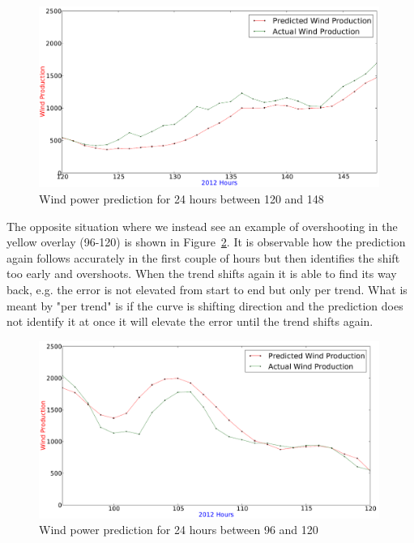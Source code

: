 \begin{figure}[H]
\centering
\includegraphics[width=0.99\textwidth]{billeder/bestInputCombi120-148.png}
\caption{Wind power prediction for 24 hours between 120 and 148}
\label{fig:bestInputCombi120-148}
\end{figure} 

The opposite situation where we instead see an example of overshooting in the yellow overlay (96-120) is shown in Figure~\ref{fig:bestInputCombi96-120}. It is observable how the prediction again follows accurately in the first couple of hours but then identifies the shift too early and overshoots. When the trend shifts again it is able to find its way back, e.g. the error is not elevated from start to end but only per trend. What is meant by "per trend" is if the curve is shifting direction and the prediction does not identify it at once it will elevate the error until the trend shifts again. 

\begin{figure}[H]
\centering
\includegraphics[width=0.99\textwidth]{billeder/bestInputCombi96-120.png}
\caption{Wind power prediction for 24 hours between 96 and 120}
\label{fig:bestInputCombi96-120}
\end{figure} 

